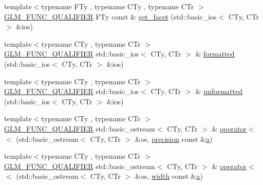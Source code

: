 \begin{DoxyCompactItemize}
\item 
{\footnotesize template$<$typename F\+Ty , typename C\+Ty , typename C\+Tr $>$ }\\\mbox{\hyperlink{setup_8hpp_a33fdea6f91c5f834105f7415e2a64407}{G\+L\+M\+\_\+\+F\+U\+N\+C\+\_\+\+Q\+U\+A\+L\+I\+F\+I\+ER}} F\+Ty const  \& \mbox{\hyperlink{namespaceglm_1_1io_a9e8927cf032254b0eee4ec650286e1f9}{get\+\_\+facet}} (std\+::basic\+\_\+ios$<$ C\+Ty, C\+Tr $>$ \&ios)
\item 
{\footnotesize template$<$typename C\+Ty , typename C\+Tr $>$ }\\\mbox{\hyperlink{setup_8hpp_a33fdea6f91c5f834105f7415e2a64407}{G\+L\+M\+\_\+\+F\+U\+N\+C\+\_\+\+Q\+U\+A\+L\+I\+F\+I\+ER}} std\+::basic\+\_\+ios$<$ C\+Ty, C\+Tr $>$ \& \mbox{\hyperlink{namespaceglm_1_1io_aa31ec433f6039e5bd35f0f58b37bef83}{formatted}} (std\+::basic\+\_\+ios$<$ C\+Ty, C\+Tr $>$ \&ios)
\item 
{\footnotesize template$<$typename C\+Ty , typename C\+Tr $>$ }\\\mbox{\hyperlink{setup_8hpp_a33fdea6f91c5f834105f7415e2a64407}{G\+L\+M\+\_\+\+F\+U\+N\+C\+\_\+\+Q\+U\+A\+L\+I\+F\+I\+ER}} std\+::basic\+\_\+ios$<$ C\+Ty, C\+Tr $>$ \& \mbox{\hyperlink{namespaceglm_1_1io_a8f950faa7ad67cac1287beaf896a8bb6}{unformatted}} (std\+::basic\+\_\+ios$<$ C\+Ty, C\+Tr $>$ \&ios)
\item 
{\footnotesize template$<$typename C\+Ty , typename C\+Tr $>$ }\\\mbox{\hyperlink{setup_8hpp_a33fdea6f91c5f834105f7415e2a64407}{G\+L\+M\+\_\+\+F\+U\+N\+C\+\_\+\+Q\+U\+A\+L\+I\+F\+I\+ER}} std\+::basic\+\_\+ostream$<$ C\+Ty, C\+Tr $>$ \& \mbox{\hyperlink{namespaceglm_1_1io_ac52a8c5f8ea189f5bae2e5b8e382675f}{operator$<$$<$}} (std\+::basic\+\_\+ostream$<$ C\+Ty, C\+Tr $>$ \&os, \mbox{\hyperlink{structglm_1_1io_1_1precision}{precision}} const \&\mbox{\hyperlink{_s_d_l__opengl__glext_8h_a3309789fc188587d666cda5ece79cf82}{a}})
\item 
{\footnotesize template$<$typename C\+Ty , typename C\+Tr $>$ }\\\mbox{\hyperlink{setup_8hpp_a33fdea6f91c5f834105f7415e2a64407}{G\+L\+M\+\_\+\+F\+U\+N\+C\+\_\+\+Q\+U\+A\+L\+I\+F\+I\+ER}} std\+::basic\+\_\+ostream$<$ C\+Ty, C\+Tr $>$ \& \mbox{\hyperlink{namespaceglm_1_1io_ac4783e4e3b0384619625d5d2d00c27b8}{operator$<$$<$}} (std\+::basic\+\_\+ostream$<$ C\+Ty, C\+Tr $>$ \&os, \mbox{\hyperlink{structglm_1_1io_1_1width}{width}} const \&\mbox{\hyperlink{_s_d_l__opengl__glext_8h_a3309789fc188587d666cda5ece79cf82}{a}})
\item 

\end{DoxyCompactItemize}
